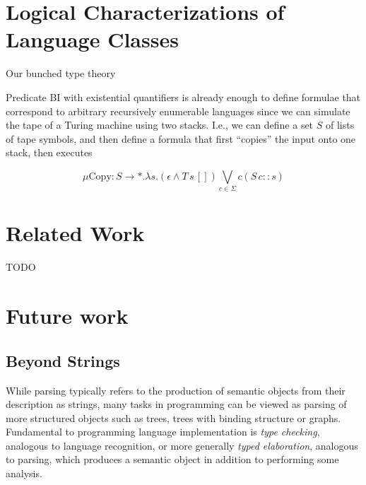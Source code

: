 \documentclass[sigconf,anonymous,review,screen]{acmart}
\begin{document}
\section{Logical Characterizations of Language Classes}

Our bunched type theory 

Predicate BI with existential quantifiers is already enough to define
formulae that correspond to arbitrary recursively enumerable languages
since we can simulate the tape of a Turing machine using two
stacks. I.e., we can define a set $S$ of lists of tape symbols, and
then define a formula that first ``copies'' the input onto one stack, then executes

\[ \mu \textrm{Copy} : S \to *. \lambda s. (\epsilon \wedge T\,s\,[])\bigvee_{c \in \Sigma} c (S\,{c::s}) \]


\section{Related Work}

TODO 


\section{Future work}

\subsection{Beyond Strings}

While parsing typically refers to the production of semantic objects
from their description as strings, many tasks in programming can be
viewed as parsing of more structured objects such as trees, trees with
binding structure or graphs. Fundamental to programming language
implementation is \emph{type checking}, analogous to language
recognition, or more generally \emph{typed elaboration}, analogous to
parsing, which produces a semantic object in addition to performing
some analysis.
\end{document}
